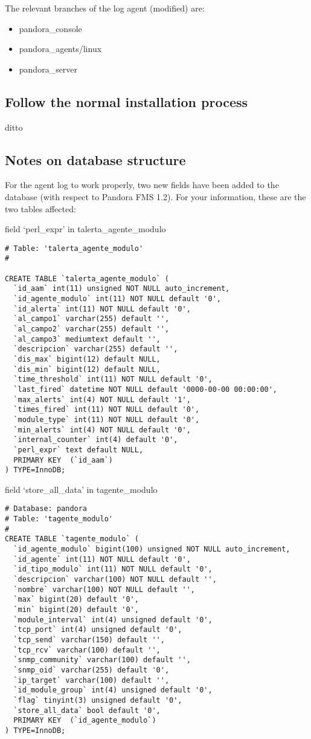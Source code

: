 \documentclass[a4paper,10pt]{article}
\begin{document}
The relevant branches of the log agent (modified) are:

\begin{itemize}
\item pandora\_console
\item pandora\_agents/linux
\item pandora\_server
\end{itemize}

\subsection{Follow the normal installation process}

ditto

\subsection{Notes on database structure}

For the agent log to work properly, two new fields have been added to the database (with respect to Pandora FMS 1.2). For your information, these are the two tables affected:

field `perl\_expr' in talerta\_agente\_modulo
\begin{verbatim}
# Table: 'talerta_agente_modulo'
# 

CREATE TABLE `talerta_agente_modulo` (
  `id_aam` int(11) unsigned NOT NULL auto_increment,
  `id_agente_modulo` int(11) NOT NULL default '0',
  `id_alerta` int(11) NOT NULL default '0',
  `al_campo1` varchar(255) default '',
  `al_campo2` varchar(255) default '',
  `al_campo3` mediumtext default '',
  `descripcion` varchar(255) default '',
  `dis_max` bigint(12) default NULL,
  `dis_min` bigint(12) default NULL,
  `time_threshold` int(11) NOT NULL default '0',
  `last_fired` datetime NOT NULL default '0000-00-00 00:00:00',
  `max_alerts` int(4) NOT NULL default '1',
  `times_fired` int(11) NOT NULL default '0',
  `module_type` int(11) NOT NULL default '0',
  `min_alerts` int(4) NOT NULL default '0',
  `internal_counter` int(4) default '0',
  `perl_expr` text default NULL,
  PRIMARY KEY  (`id_aam`)
) TYPE=InnoDB;
\end{verbatim}

field `store\_all\_data' in tagente\_modulo
\begin{verbatim}
# Database: pandora
# Table: 'tagente_modulo'
# 
CREATE TABLE `tagente_modulo` (
  `id_agente_modulo` bigint(100) unsigned NOT NULL auto_increment,
  `id_agente` int(11) NOT NULL default '0',
  `id_tipo_modulo` int(11) NOT NULL default '0',
  `descripcion` varchar(100) NOT NULL default '',
  `nombre` varchar(100) NOT NULL default '',
  `max` bigint(20) default '0',
  `min` bigint(20) default '0',
  `module_interval` int(4) unsigned default '0',
  `tcp_port` int(4) unsigned default '0',
  `tcp_send` varchar(150) default '',
  `tcp_rcv` varchar(100) default '',
  `snmp_community` varchar(100) default '',
  `snmp_oid` varchar(255) default '0',
  `ip_target` varchar(100) default '',
  `id_module_group` int(4) unsigned default '0',
  `flag` tinyint(3) unsigned default '0',
  `store_all_data` bool default '0',
  PRIMARY KEY  (`id_agente_modulo`)
) TYPE=InnoDB;
\end{verbatim}
\end{document}
